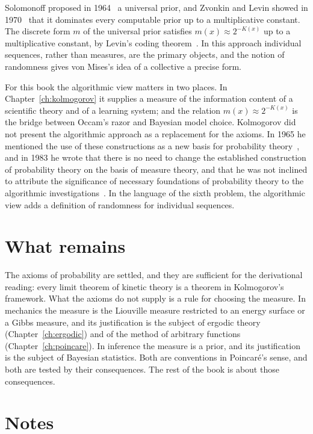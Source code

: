 Solomonoff proposed in 1964~\cite{solomonoff1964} a universal prior, and Zvonkin and Levin showed in 1970~\cite{zvonkinlevin1970} that it dominates every computable prior up to a multiplicative constant. The discrete form $m$ of the universal prior satisfies $m(x)\approx 2^{-K(x)}$ up to a multiplicative constant, by Levin's coding theorem~\cite{levin1974}. In this approach individual sequences, rather than measures, are the primary objects, and the notion of randomness gives von Mises's idea of a collective a precise form.

For this book the algorithmic view matters in two places. In Chapter~\ref{ch:kolmogorov} it supplies a measure of the information content of a scientific theory and of a learning system; and the relation $m(x)\approx 2^{-K(x)}$ is the bridge between Occam's razor and Bayesian model choice. Kolmogorov did not present the algorithmic approach as a replacement for the axioms. In 1965 he mentioned the use of these constructions as a new basis for probability theory~\cite{kolmogorov1965}, and in 1983 he wrote that there is no need to change the established construction of probability theory on the basis of measure theory, and that he was not inclined to attribute the significance of necessary foundations of probability theory to the algorithmic investigations~\cite{kolmogorov1983}. In the language of the sixth problem, the algorithmic view adds a definition of randomness for individual sequences.

\section{What remains}

The axioms of probability are settled, and they are sufficient for the derivational reading: every limit theorem of kinetic theory is a theorem in Kolmogorov's framework. What the axioms do not supply is a rule for choosing the measure. In mechanics the measure is the Liouville measure restricted to an energy surface or a Gibbs measure, and its justification is the subject of ergodic theory (Chapter~\ref{ch:ergodic}) and of the method of arbitrary functions (Chapter~\ref{ch:poincare}). In inference the measure is a prior, and its justification is the subject of Bayesian statistics. Both are conventions in Poincar\'e's sense, and both are tested by their consequences. The rest of the book is about those consequences.



\section*{Notes}

